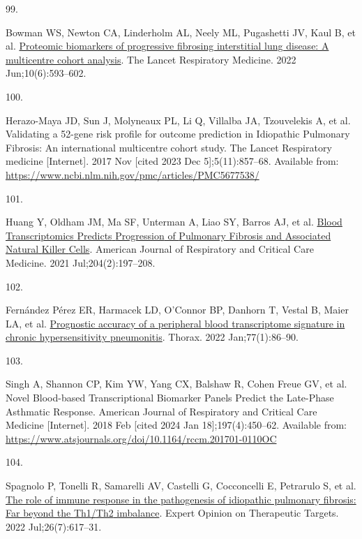 \documentclass[
]{article}
\newlength{\cslhangindent}
\newlength{\csllabelwidth}
\newlength{\cslentryspacingunit} %
\newenvironment{CSLReferences}[2] %
 {%
  \setlength{\parindent}{0pt}
  \ifodd #1
  \let\oldpar\par
  \def\par{\hangindent=\cslhangindent\oldpar}
  \fi
  \setlength{\parskip}{#2\cslentryspacingunit}
 }%
 {}
\newcommand{\CSLLeftMargin}[1]{\parbox[t]{\csllabelwidth}{#1}}
\newcommand{\CSLRightInline}[1]{\parbox[t]{\linewidth - \csllabelwidth}{#1}\break}
\begin{document}
\begin{CSLReferences}{0}{0}
\leavevmode{}%
\CSLLeftMargin{99. }%
\CSLRightInline{Bowman WS, Newton CA, Linderholm AL, Neely ML, Pugashetti JV, Kaul B, et al. \href{https://doi.org/10.1016/S2213-2600(21)00503-8}{Proteomic biomarkers of progressive fibrosing interstitial lung disease: A multicentre cohort analysis}. The Lancet Respiratory Medicine. 2022 Jun;10(6):593--602. }

\leavevmode{}%
\CSLLeftMargin{100. }%
\CSLRightInline{Herazo-Maya JD, Sun J, Molyneaux PL, Li Q, Villalba JA, Tzouvelekis A, et al. Validating a 52-gene risk profile for outcome prediction in {Idiopathic} {Pulmonary} {Fibrosis}: An international multicentre cohort study. The Lancet Respiratory medicine {[}Internet{]}. 2017 Nov {[}cited 2023 Dec 5{]};5(11):857--68. Available from: \url{https://www.ncbi.nlm.nih.gov/pmc/articles/PMC5677538/}}

\leavevmode{}%
\CSLLeftMargin{101. }%
\CSLRightInline{Huang Y, Oldham JM, Ma SF, Unterman A, Liao SY, Barros AJ, et al. \href{https://doi.org/10.1164/rccm.202008-3093OC}{Blood {Transcriptomics} {Predicts} {Progression} of {Pulmonary} {Fibrosis} and {Associated} {Natural} {Killer} {Cells}}. American Journal of Respiratory and Critical Care Medicine. 2021 Jul;204(2):197--208. }

\leavevmode{}%
\CSLLeftMargin{102. }%
\CSLRightInline{Fernández Pérez ER, Harmacek LD, O'Connor BP, Danhorn T, Vestal B, Maier LA, et al. \href{https://doi.org/10.1136/thoraxjnl-2020-214790}{Prognostic accuracy of a peripheral blood transcriptome signature in chronic hypersensitivity pneumonitis}. Thorax. 2022 Jan;77(1):86--90. }

\leavevmode{}%
\CSLLeftMargin{103. }%
\CSLRightInline{Singh A, Shannon CP, Kim YW, Yang CX, Balshaw R, Cohen Freue GV, et al. Novel {Blood}-based {Transcriptional} {Biomarker} {Panels} {Predict} the {Late}-{Phase} {Asthmatic} {Response}. American Journal of Respiratory and Critical Care Medicine {[}Internet{]}. 2018 Feb {[}cited 2024 Jan 18{]};197(4):450--62. Available from: \url{https://www.atsjournals.org/doi/10.1164/rccm.201701-0110OC}}

\leavevmode{}%
\CSLLeftMargin{104. }%
\CSLRightInline{Spagnolo P, Tonelli R, Samarelli AV, Castelli G, Cocconcelli E, Petrarulo S, et al. \href{https://doi.org/10.1080/14728222.2022.2114897}{The role of immune response in the pathogenesis of idiopathic pulmonary fibrosis: Far beyond the {Th1}/{Th2} imbalance}. Expert Opinion on Therapeutic Targets. 2022 Jul;26(7):617--31. }


\end{CSLReferences}
\end{document}
